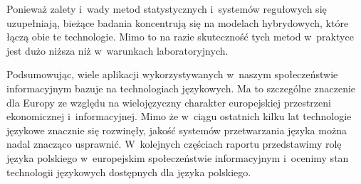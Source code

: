 \begin{multicols}{2}
Ponieważ zalety i~wady metod statystycznych i~systemów regułowych
się uzupełniają, bieżące badania koncentrują się na modelach
hybrydowych, które łączą obie te technologie. Mimo to na razie
skuteczność tych metod w~praktyce jest dużo niższa niż
w~warunkach laboratoryjnych. 

Podsumowując, wiele aplikacji wykorzystywanych w~naszym
społeczeństwie informacyjnym bazuje na technologiach językowych. Ma
to szczególne znaczenie dla Europy ze względu na wielojęzyczny
charakter europejskiej przestrzeni ekonomicznej i~informacyjnej. Mimo
że w~ciągu ostatnich kilku lat technologie językowe znacznie się
rozwinęły, jakość systemów przetwarzania języka można nadal
znacząco usprawnić. W~kolejnych częściach raportu przedstawimy
rolę języka polskiego w~europejskim społeczeństwie informacyjnym
i~ocenimy stan technologii językowych dostępnych dla języka
polskiego. 

\end{multicols} 

\clearpage 



